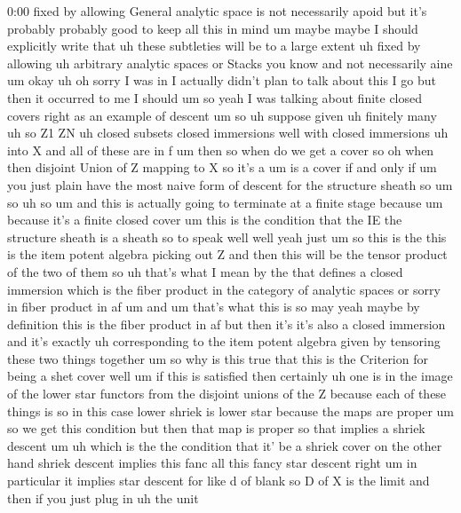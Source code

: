 \begin{unfinished}{0:00}
fixed  by  allowing  General  analytic  space
is  not  necessarily  apoid  but  it's
probably  probably  good  to  keep  all  this
in
mind
um
maybe  maybe  I  should  explicitly  write
that  uh  these
subtleties  will  be  to  a  large
extent  uh
fixed  by
allowing  uh  arbitrary  analytic
spaces  or  Stacks  you
know
and  not  necessarily
aine
um
okay  uh  oh  sorry  I  was  in  I  actually
didn't  plan  to  talk  about  this  I  go  but
then  it  occurred  to  me  I  should  um  so
yeah  I  was  talking  about  finite  closed
covers  right  as  an  example  of  descent  um
so  uh  suppose
given
uh  finitely
many  uh  so  Z1  ZN  uh  closed  subsets
closed
immersions  well  with  closed
immersions  uh  into  X  and  all  of  these
are  in
f
um
then  so  when  do  we  get  a  cover  so  oh
when  then  disjoint  Union  of  Z  mapping  to
X  so  it's  a  um  is  a
cover  if  and  only  if
um  you  just  plain  have  the  most  naive
form  of  descent  for  the  structure  sheath
so  um
so
uh
so
um  and  this  is  actually  going  to
terminate  at  a  finite  stage  because  um
because  it's  a  finite  closed
cover
um  this  is  the  condition  that  the  IE  the
structure  sheath  is  a  sheath  so  to  speak
well  well  yeah  just  um  so  this  is  the
this  is  the  item  potent  algebra  picking
out  Z  and  then  this  will  be  the  tensor
product  of  the  two  of  them
so  uh  that's  what  I  mean  by  the  that
defines  a  closed  immersion  which  is  the
fiber  product  in  the  category  of
analytic  spaces  or  sorry  in  fiber
product  in  af  um  and  um  that's  what  this
is  so  may  yeah  maybe  by  definition  this
is  the  fiber  product  in  af  but  then  it's
it's  also  a  closed  immersion  and  it's
exactly  uh  corresponding  to  the  item
potent  algebra  given  by  tensoring  these
two  things
together
um  so  why  is  this  true  that  this  is  the
Criterion  for  being  a  shet  cover  well  um
if  this  is  satisfied
then  certainly  uh  one  is  in  the  image  of
the  lower  star  functors  from  the
disjoint  unions  of  the  Z  because  each  of
these  things  is  so  in  this  case  lower
shriek  is  lower  star  because  the  maps
are  proper  um  so  we  get  this  condition
but  then  that  map  is  proper  so  that
implies  a  shriek
descent
um  uh  which  is  the  the  condition  that
it'  be  a  shriek  cover  on  the  other  hand
shriek  descent  implies  this  fanc  all
this  fancy  star  descent  right  um  in
particular  it  implies  star  descent  for
like  d  of  blank  so  D  of  X  is  the  limit
and  then  if  you  just  plug  in  uh  the  unit

\end{unfinished}
